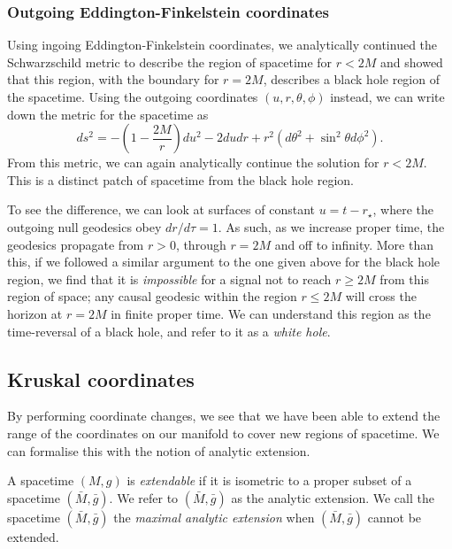 \subsubsection{Outgoing Eddington-Finkelstein coordinates}

Using ingoing Eddington-Finkelstein coordinates, we analytically continued the Schwarzschild metric to describe the region of spacetime for $r < 2M$ and showed that this region, with the boundary for $r = 2M$, describes a black hole region of the spacetime. Using the outgoing coordinates $(u,r,\theta, \phi)$ instead, we can write down the metric for the spacetime as
\begin{equation*}
	ds^2 = - \left( 1 - \frac{2M}{r} \right) du^2 - 2 du dr + r^2 \left( d\theta^2 + \sin^2\theta d\phi^2 \right) .
\end{equation*}
From this metric, we can again analytically continue the \sch solution for $r < 2M$. This is a distinct patch of spacetime from the black hole region.

To see the difference, we can look at surfaces of constant $u = t - r_\star$, where the outgoing null geodesics obey $dr / d\tau = 1$. As such, as we increase proper time, the geodesics propagate from $r > 0$, through $r = 2M$ and off to infinity. More than this, if we followed a similar argument to the one given above for the black hole region, we find that it is \emph{impossible} for a signal not to reach $r \geq 2M$ from this region of space; any causal geodesic within the region $r \leq 2M$ will cross the horizon at $r = 2M$ in finite proper time. We can understand this region as the time-reversal of a black hole, and refer to it as a \emph{white hole}.     

\subsection{Kruskal coordinates}

By performing coordinate changes, we see that we have been able to extend the range of the coordinates on our manifold to cover new regions of spacetime. We can formalise this with the notion of analytic extension.

\begin{defn}
	A spacetime $(M,g)$ is \emph{extendable} if it is isometric to a proper subset of a spacetime $(\bar{M}, \bar{g})$. We refer to $(\bar{M}, \bar{g})$ as the analytic extension. We call the spacetime $(\bar{M}, \bar{g})$ the \emph{maximal analytic extension} when $(\bar{M}, \bar{g})$ cannot be extended.
\end{defn}

